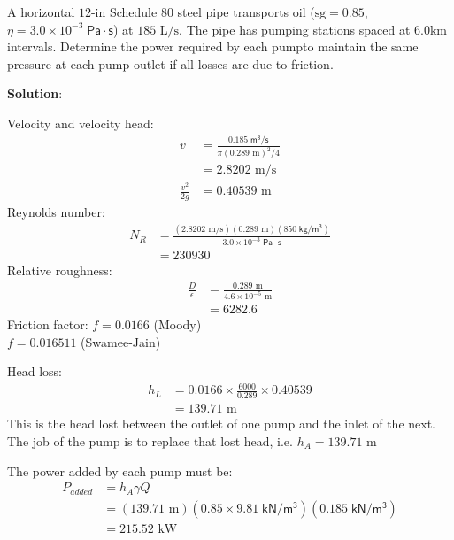 \documentclass[10pt]{amsart}
\begin{document}
	A horizontal $12\text{-in}$ Schedule $80$ steel pipe transports oil ($\text{sg}=0.85$,
	$\eta=3.0\times10^{-3}\;\mathsf{Pa\cdot s}$) at $185\text{ L/s}$. The pipe has pumping stations spaced at $6.0\text{
	km}$ intervals. Determine the power required by each pumpto maintain the same pressure at each pump outlet 
	if all losses are due to friction.
			
	\textbf{Solution}:
	
	Velocity and velocity head:
	\begin{align*}
		v &= \frac{0.185\;\mathsf{m^3/s}}{\pi(0.289\text{ m})^2/4}\\
		&= 2.8202\text{ m/s}\\
		\frac{v^2}{2g} &= 0.40539\text{ m}		
	\end{align*}
	Reynolds number:
	\begin{align*}
		N_R &= \frac{(2.8202\text{ m/s})(0.289\text{ m})(850\;\mathsf{kg/m^3})}{3.0\times10^{-3}\;\mathsf{Pa\cdot s}}\\
		&= 230930		
	\end{align*}
	Relative roughness:
	\begin{align*}
		\frac{D}{\epsilon} &= \frac{0.289\text{ m}}{4.6\times10^{-5}\text{ m}}\\
		&= 6282.6
	\end{align*}
	Friction factor:
	$f=0.0166$ (Moody)\\
	$f=0.016511$ (Swamee-Jain)\par\medskip
	Head loss:
	\begin{align*}
		h_L &= 0.0166\times\frac{6000}{0.289}\times 0.40539\\
		&= 139.71\text{ m}
	\end{align*}
	This is the head lost between the outlet of one pump and the inlet of the next. The job of the pump is to replace that
	lost head, i.e. $h_A=139.71\text{ m}$\par\medskip
	The power added by each pump must be:
	\begin{align*}
		P_{added} &= h_A\gamma Q\\
		&= (139.71\text{ m})(0.85\times9.81\;\mathsf{kN/m^3})(0.185\;\mathsf{kN/m^3})\\
		&= 215.52\text{ kW}
	\end{align*}
	
\end{document}
